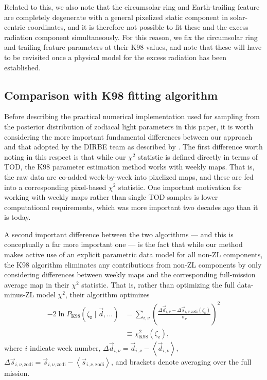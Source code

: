 \documentclass[twocolumn]{aa}
\newcommand{\dv}[0]{\vec{d}}
\newcommand{\s}[0]{\vec{s}}
\begin{document}
Related to this, we also note that the circumsolar ring and Earth-trailing
feature are completely degenerate
with a general pixelized static component in solar-centric
coordinates, and it is therefore not possible to fit these and the
excess radiation component simultaneously. For this reason, we fix the
circumsolar ring and trailing feature parameters at their K98 values,
and note that these will have to be revisited once a physical model
for the excess radiation has been established.

\subsection{Comparison with K98 fitting algorithm}
\label{sec:algorithm_comparison}

Before describing the practical numerical implementation used for
sampling from the posterior distribution of zodiacal light 
parameters in this paper, it is worth
considering the more important fundamental differences between
our approach and that adopted by the DIRBE team as described by
\citet{kelsall1998}. The first difference worth noting in this respect
is that while our $\chi^2$ statistic is defined directly in terms of
TOD, the K98 parameter estimation method works with weekly maps. That
is, the raw data are co-added week-by-week into pixelized maps, and
these are fed into a corresponding pixel-based $\chi^2$ statistic. One
important motivation for working with weekly maps rather than single
TOD samples is lower computational requirements, which was more
important two decades ago than it is today.

A second important difference between the two algorithms --- and this
is conceptually a far more important one --- is the fact that while our
method makes active use of an explicit parametric data model for all
non-ZL components, the K98 algorithm eliminates any contributions from
non-ZL components by only considering differences between weekly maps
and the corresponding full-mission average map in their $\chi^2$
statistic. That is, rather than optimizing the full data-minus-ZL model 
$\chi^2$, their algorithm optimizes
\begin{align}
  -2\ln P_{\mathrm{K98}}(\zeta_{\mathrm{z}} \mid\dv, \ldots) &= \sum_{i,\nu}
  \left(\frac{\Delta\dv_{i,\nu} -
    \Delta\s_{i,\nu,\mathrm{zodi}}(\zeta_\mathrm{s})}{\sigma_{\nu}}\right)^2 \nonumber\\
    &\equiv \chi^2_{\mathrm{K98}} (\zeta_{\mathrm{z}}),
  \label{eq:k98_chisq}
\end{align}
where $i$ indicate week number, $\Delta \dv_{i,\nu} = \dv_{i,\nu} -
\left<\dv_{i,\nu}\right>$, $\Delta \s_{i,\nu,\mathrm{zodi}} =
\s_{i,\nu,\mathrm{zodi}} - \left<\s_{i,\nu,\mathrm{zodi}}\right>$, and brackets
denote averaging over the full mission.
\end{document}

